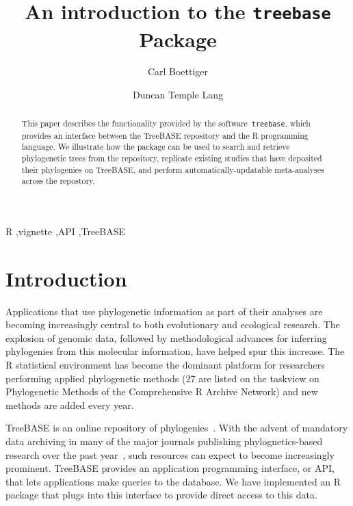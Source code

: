 \documentclass{elsarticle}
\begin{document}
\begin{frontmatter}
  \title{An introduction to the \texttt{treebase} Package}
  \author[davis]{Carl Boettiger}
  \author[stats]{Duncan Temple Lang}
  \address[davis]{Center for Population Biology, University of California, Davis, United States}
  \address[stats]{Department of Statistics, University of California, Davis, United States}

  \begin{abstract}
  This paper describes the functionality provided by the software~\texttt{treebase},
  which provides an interface between the TreeBASE repository and the R programming language.  
  We illustrate how the package can be used to search and retrieve phylogenetic trees from the repository,
  replicate existing studies that have deposited their phylogenies on TreeBASE,
  and perform automatically-updatable meta-analyses across the repostory.  

  \end{abstract}

  \begin{keyword}
   R  \sep vignette \sep API \sep TreeBASE
   \end{keyword}
 \end{frontmatter}

\section{Introduction}
Applications that use phylogenetic information as part of their analyses 
are becoming increasingly central to both evolutionary and ecological research. 
The explosion of genomic data, followed by methodological advances for inferring phylogenies from this molecular information,
have helped spur this increase.
The R statistical environment has become the dominant platform for researchers performing applied phylogenetic methods
(27 are listed on the taskview on Phylogenetic Methods of the Comprehensive R Archive Network) 
and new methods are added every year.  

TreeBASE is an online repository of phylogenies~\citep{Sanderson1994b}.  
With the advent of mandatory data archiving in many of the major journals publishing phylognetics-based research 
over the past year~\citep{Fairbairn2010, Piwowar2011, Whitlock2010}, 
such resources can expect to become increasingly prominent.  
TreeBASE provides an application programming interface, or API, that lets applications make queries to the database.  
We have implemented an R package that plugs into this interface to provide direct access to this data.  
\end{document}
